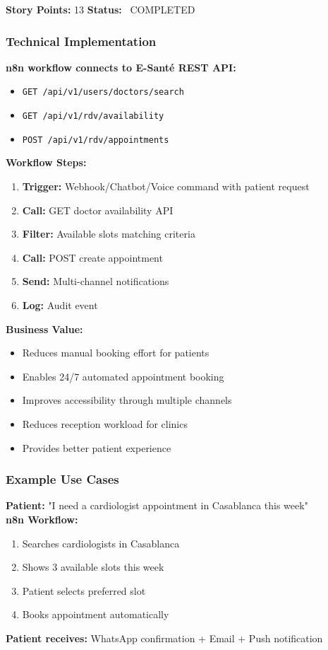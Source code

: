 \documentclass[11pt,a4paper]{article}
\begin{document}
\textbf{Story Points:} 13 \hfill \textbf{Status:} \textcolor{successgreen}{\faCheckCircle\ COMPLETED}

\subsubsection{Technical Implementation}

\textbf{n8n workflow connects to E-Santé REST API:}

\begin{itemize}
    \item \texttt{GET /api/v1/users/doctors/search}
    \item \texttt{GET /api/v1/rdv/availability}
    \item \texttt{POST /api/v1/rdv/appointments}
\end{itemize}

\textbf{Workflow Steps:}
\begin{enumerate}
    \item \textbf{Trigger:} Webhook/Chatbot/Voice command with patient request
    \item \textbf{Call:} GET doctor availability API
    \item \textbf{Filter:} Available slots matching criteria
    \item \textbf{Call:} POST create appointment
    \item \textbf{Send:} Multi-channel notifications
    \item \textbf{Log:} Audit event
\end{enumerate}

\textbf{Business Value:}
\begin{itemize}
    \item Reduces manual booking effort for patients
    \item Enables 24/7 automated appointment booking
    \item Improves accessibility through multiple channels
    \item Reduces reception workload for clinics
    \item Provides better patient experience
\end{itemize}

\subsubsection{Example Use Cases}

\begin{successbox}
\textbf{Patient:} "I need a cardiologist appointment in Casablanca this week"\\[0.3cm]
\textbf{n8n Workflow:}
\begin{enumerate}
    \item Searches cardiologists in Casablanca
    \item Shows 3 available slots this week
    \item Patient selects preferred slot
    \item Books appointment automatically
\end{enumerate}
\textbf{Patient receives:} WhatsApp confirmation + Email + Push notification
\end{successbox}
\end{document}
